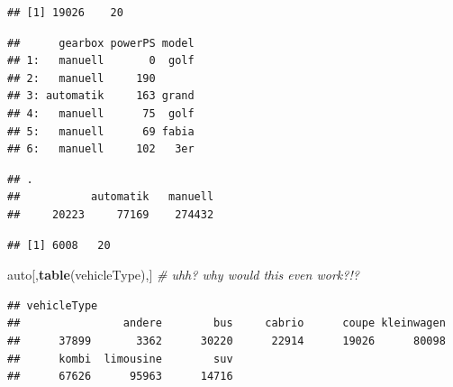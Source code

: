 \documentclass[]{book}
\newenvironment{Shaded}{\begin{snugshade}}{\end{snugshade}}
\newcommand{\KeywordTok}[1]{\textcolor[rgb]{0.13,0.29,0.53}{\textbf{#1}}}
\newcommand{\StringTok}[1]{\textcolor[rgb]{0.31,0.60,0.02}{#1}}
\newcommand{\CommentTok}[1]{\textcolor[rgb]{0.56,0.35,0.01}{\textit{#1}}}
\newcommand{\OperatorTok}[1]{\textcolor[rgb]{0.81,0.36,0.00}{\textbf{#1}}}
\newcommand{\NormalTok}[1]{#1}
\theoremstyle{definition}
\theoremstyle{definition}
\theoremstyle{definition}
\theoremstyle{remark}
\begin{document}
\begin{verbatim}
## [1] 19026    20
\end{verbatim}

\begin{Shaded}
\end{Shaded}

\begin{verbatim}
##      gearbox powerPS model
## 1:   manuell       0  golf
## 2:   manuell     190      
## 3: automatik     163 grand
## 4:   manuell      75  golf
## 5:   manuell      69 fabia
## 6:   manuell     102   3er
\end{verbatim}

\begin{Shaded}
\end{Shaded}

\begin{verbatim}
## .
##           automatik   manuell 
##     20223     77169    274432
\end{verbatim}

\begin{Shaded}
\end{Shaded}

\begin{verbatim}
## [1] 6008   20
\end{verbatim}

\begin{Shaded}
\begin{Highlighting}[]
\NormalTok{auto[,}\KeywordTok{table}\NormalTok{(vehicleType),] }\CommentTok{# uhh? why would this even work?!?}
\end{Highlighting}
\end{Shaded}

\begin{verbatim}
## vehicleType
##                andere        bus     cabrio      coupe kleinwagen 
##      37899       3362      30220      22914      19026      80098 
##      kombi  limousine        suv 
##      67626      95963      14716
\end{verbatim}
\end{document}
